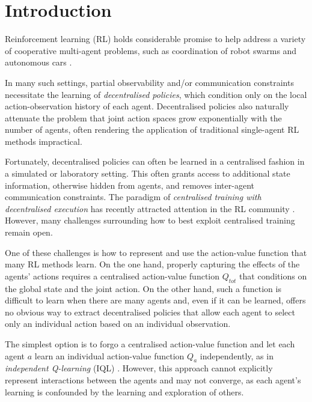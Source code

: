 \documentclass[twoside,11pt]{article}
\renewcommand{\cite}{\citep}
\begin{document}
\section{Introduction}
\label{sec:intro}

Reinforcement learning (RL) holds considerable promise to help address a variety of cooperative multi-agent problems, such as coordination of robot swarms \cite{huttenrauch_guided_2017} and autonomous cars \cite{cao_overview_2012}. 

In many such settings, partial observability and/or communication constraints necessitate the learning of \textit{decentralised policies}, which condition only on the local action-observation history of each agent. Decentralised policies also naturally attenuate the problem that joint action spaces grow exponentially with the number of agents, often rendering the application of traditional single-agent RL methods impractical.

Fortunately, decentralised policies can often be learned in a centralised fashion in a simulated or laboratory setting. This often grants access to additional state information, otherwise hidden from agents, and removes inter-agent communication constraints. 
The paradigm of \textit{centralised training with decentralised execution} \cite{oliehoek_optimal_2008,kraemer_multi-agent_2016} has recently attracted attention in the RL community \cite{jorge_learning_2016,foerster_counterfactual_2017}. 
However, many challenges surrounding how to best exploit centralised training remain open.

One of these challenges is how to represent and use the action-value function 
that many RL methods learn.  On the one hand, properly capturing the effects of 
the agents' actions requires a centralised action-value function $Q_{tot}$ that 
conditions on the global state and the joint action.  On the other hand, such a 
function is difficult to learn when there are many agents and, even if it can 
be learned, offers no obvious way to extract decentralised policies that allow 
each agent to select only an individual action based on an individual 
observation.

The simplest option is to forgo a centralised action-value function and let each agent $a$ learn an individual action-value function $Q_a$ independently, as in \emph{independent Q-learning} (IQL) \cite{tan_multi-agent_1993}.  However, this approach cannot explicitly represent interactions between the agents and may not converge, as each agent's learning is confounded by the learning and exploration of others.
\end{document}

